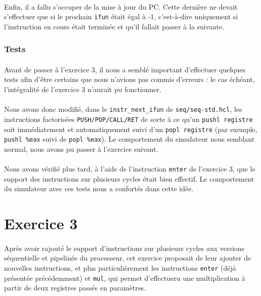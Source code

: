 \documentclass[12pt]{article}
\begin{document}
\paragraph{}Enfin, il a fallu s'occuper de la mise à jour du PC. Cette dernière ne devait s'effectuer que si le prochain \verb+ifun+ était égal à -1, c'est-à-dire uniquement si l'instruction en cours était terminée et qu'il fallait passer à la suivante. 


\subsubsection{Tests}
\paragraph{}Avant de passer à l'exercice 3, il nous a semblé important d'effectuer quelques tests afin d'être certains que nous n'avions pas commis d'erreurs : le cas échéant, l'intégralité de l'exercice 3 n'aurait pu fonctionner.

\paragraph{}Nous avons donc modifié, dans le \verb+instr_next_ifun+ de \verb+seq/seq-std.hcl+, les instructions factorisées \verb+PUSH/POP/CALL/RET+ de sorte à ce qu'un \verb+pushl registre+ soit immédiatement et automatiquement suivi d'un \verb+popl registre+ (par exemple, \verb+pushl %eax+ suivi de \verb+popl %eax+). Le comportement du simulateur nous semblant normal, nous avons pu passer à l'exercice suivant.

\paragraph{}Nous avons vérifié plus tard, à l'aide de l'instruction \verb+enter+ de l'exercice 3, que le support des instructions sur plusieurs cycles était bien effectif. Le comportement du simulateur avec ces tests nous a confortés dans cette idée.




\section{Exercice 3}
\paragraph{}Après avoir rajouté le support d'instructions sur plusieurs cycles aux versions séquentielle et pipelinée du processeur, cet exercice proposait de leur ajouter de nouvelles instructions, et plus particulièrement les instructions \verb+enter+ (déjà présentée précédemment) et \verb+mul+, qui permet d'effectueru une multiplication à partir de deux registres passés en paramètres.
\end{document}
